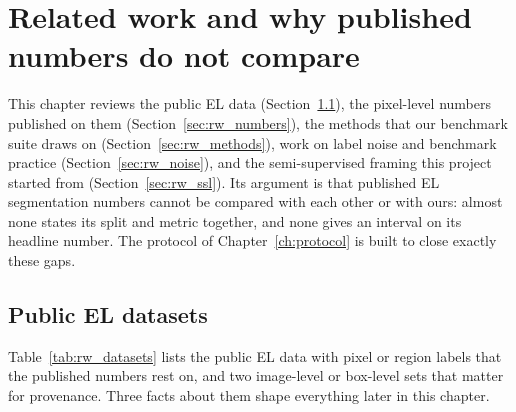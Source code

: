 \chapter{Related work and why published numbers do not compare}\label{ch:related}

This chapter reviews the public EL data (Section~\ref{sec:rw_data}), the pixel-level numbers published on them
(Section~\ref{sec:rw_numbers}), the methods that our benchmark suite draws on (Section~\ref{sec:rw_methods}), work on label
noise and benchmark practice (Section~\ref{sec:rw_noise}), and the semi-supervised framing this project started from
(Section~\ref{sec:rw_ssl}). Its argument is that published EL segmentation numbers cannot be compared with each other or with
ours: almost none states its split and metric together, and none gives an interval on its headline number. The protocol of
Chapter~\ref{ch:protocol} is built to close exactly these gaps.

\section{Public EL datasets}\label{sec:rw_data}

Table~\ref{tab:rw_datasets} lists the public EL data with pixel or region labels that the published numbers rest on, and two
image-level or box-level sets that matter for provenance. Three facts about them shape everything later in this chapter.

